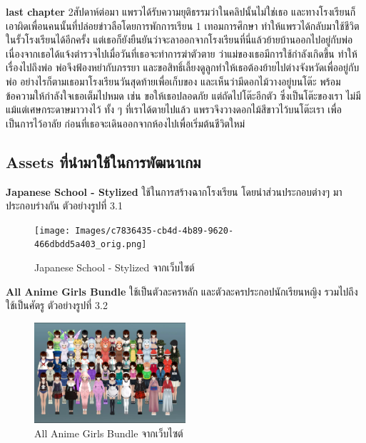 \textbf{last chapter}
2สัปดาห์ต่อมา แพรวได้รับความยุติธรรมว่าในคลิปนั้นไม่ใช่เธอ และทางโรงเรียนก็เอาผิดเพื่อนคนนั้นที่ปล่อยข่าวลือโดยการพักการเรียน 1 เทอมการศึกษา ทำให้แพรวได้กลับมาใช้ชีวิตในรั้วโรงเรียนได้อีกครั้ง แต่เธอก็ยังยืนยันว่าจะลาออกจากโรงเรียนที่นี่แล้วย้ายบ้านออกไปอยู่กับพ่อ เนื่องจากเธอได้แจ้งตำรวจไปเมื่อวันที่เธอจะทำการฆ่าตัวตาย ว่าแม่ของเธอมีการใช้กำลังเกิดขึ้น ทำให้เรื่องไปถึงพ่อ พ่อจึงฟ้องหย่ากับภรรยา และขอสิทธิ์เลี้ยงดูลูกทำให้เธอต้องย้ายไปต่างจังหวัดเพื่ออยู่กับพ่อ อย่างไรก็ตามเธอมาโรงเรียนวันสุดท้ายเพื่อเก็บของ และเห็นว่ามีดอกไม้วางอยู่บนโต๊ะ พร้อมข้อความให้กำลังใจเธอเต็มไปหมด เช่น ขอให้เธอปลอดภัย แต่ถัดไปโต๊ะอีกตัว ซึ่งเป็นโต๊ะของเรา ไม่มีแม้แต่เศษกระดาษมาวางไว้ ทั้ง ๆ ที่เราได้ตายไปแล้ว แพรวจึงวางดอกไม้สีขาวไว้บนโต๊ะเรา เพื่อเป็นการไว้อาลัย ก่อนที่เธอจะเดินออกจากห้องไปเพื่อเริ่มต้นชีวิตใหม่


\subsection{Assets ที่นำมาใช้ในการพัฒนาเกม}
\subsubitem \textbf{Japanese School - Stylized} \cite{japanese-school:asset} ใช้ในการสร้างฉากโรงเรียน โดยนำส่วนประกอบต่างๆ มาประกอบร่างกัน ตัวอย่างรูปที่ 3.1
\begin{figure}[h]
  \centering
  \texttt{[image: Images/c7836435-cb4d-4b89-9620-466dbdd5a403\_orig.png]}
  \caption{Japanese School - Stylized จากเว็บไซต์}\label{JapaneseSchool}
\end{figure}


\subsubitem \textbf{All Anime Girls Bundle} \cite{All-Anime-Girls-Bundle:asset} ใช้เป็นตัวละครหลัก และตัวละครประกอปนักเรียนหญิง รวมไปถึงใช้เป็นศัตรู ตัวอย่างรูปที่ 3.2
\begin{figure}[h]
  \centering
  \includegraphics[width=0.5\textwidth, height=0.15\textheight]{Images/All Anime Girls Bundle.png}
  \caption{All Anime Girls Bundle จากเว็บไซต์}\label{All Anime Girls Bundle}
\end{figure}


